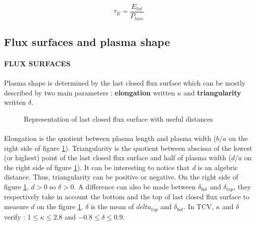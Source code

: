 \documentclass[12pt]{article}
\begin{document}
\begin{equation}
    \tau_E = \frac{E_{tot}}{P_{loss}}
\end{equation}

\subsection{Flux surfaces and plasma shape}

\paragraph{FLUX SURFACES}

\paragraph{}
Plasma shape is determined by the last closed flux surface which can be mostly described by two main parameters : \textbf{elongation} written \(\kappa\) and \textbf{triangularity} written \(\delta\). 

\begin{figure}
    \centering 
    
    \caption{Representation of last closed flux surface with useful distances}
    \label{fig:determinaton kappa&delta}
\end{figure}

\paragraph{}
Elongation is the quotient between plasma length and plasma width (\(b/a\) on the right side of figure \ref{fig:determinaton kappa&delta}). Triangularity is the quotient between abscissa of the lowest (or highest) point of the last closed flux surface and half of plasma width (\(d/a\) on the right side of figure \ref{fig:determinaton kappa&delta}). It can be interesting to notice that \textit{d} is an algebric distance. Thus, triangularity can be positive or negative. On the right side of figure \ref{fig:determinaton kappa&delta}, \(d>0\) so \(\delta >0\). A difference can also be made between \(\delta_{bot}\) and \(\delta_{top}\), they respectively take in account the bottom and the top of last closed flux surface to measure \(d\) on the figure \ref{fig:determinaton kappa&delta}. \(\delta\) is the mean of \(delta_{top}\) and \(\delta_{bot}\). In TCV, \(\kappa\) and \(\delta\) verify : \(1 \leq \kappa \leq 2.8\) and \(-0.8 \leq \delta \leq 0.9\).
\end{document}
